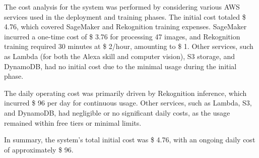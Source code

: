 The cost analysis for the system was performed by considering various AWS services used in the deployment and training phases. The initial cost totaled \$ 4.76, which covered SageMaker and Rekognition training expenses. SageMaker incurred a one-time cost of \$ 3.76 for processing 47 images, and Rekognition training required 30 minutes at \$ 2/hour, amounting to \$ 1. Other services, such as Lambda (for both the Alexa skill and computer vision), S3 storage, and DynamoDB, had no initial cost due to the minimal usage during the initial phase.

The daily operating cost was primarily driven by Rekognition inference, which incurred \$ 96 per day for continuous usage. Other services, such as Lambda, S3, and DynamoDB, had negligible or no significant daily costs, as the usage remained within free tiers or minimal limits.

In summary, the system’s total initial cost was \$ 4.76, with an ongoing daily cost of approximately \$ 96.

